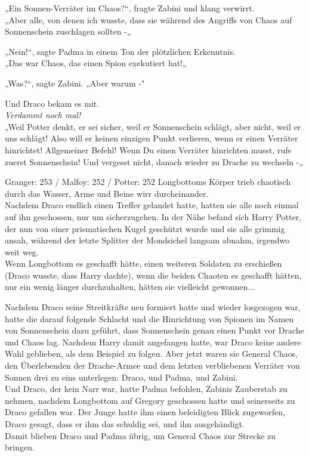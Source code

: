 {„Ein Sonnen-Verräter im Chaos?“, fragte Zabini und klang verwirrt.\\ „Aber alle, von denen ich wusste, dass sie während des Angriffs von Chaos auf Sonnenschein zuschlagen sollten -„

„Nein!“, sagte Padma in einem Ton der plötzlichen Erkenntnis.\\ „Das war Chaos, das einen Spion exekutiert hat!„

„Was?“, sagte Zabini. „Aber warum -"

Und Draco bekam es mit.\\ \emph{Verdammt noch mal!}\\ „Weil Potter denkt, er sei sicher, weil er Sonnenschein schlägt, aber nicht, weil er uns schlägt! Also will er keinen einzigen Punkt verlieren, wenn er einen Verräter hinrichtet! Allgemeiner Befehl! Wenn Du einen Verräter hinrichten musst, rufe zuerst Sonnenschein! Und vergesst nicht, danach wieder zu Drache zu wechseln -„

Granger: 253 / Malfoy: 252 / Potter: 252 Longbottoms Körper trieb chaotisch durch das Wasser, Arme und Beine wirr durcheinander.\\ Nachdem Draco endlich einen Treffer gelandet hatte, hatten sie alle noch einmal auf ihn geschossen, nur um sicherzugehen. In der Nähe befand sich Harry Potter, der nun von einer prismatischen Kugel geschützt wurde und sie alle grimmig ansah, während der letzte Splitter der Mondsichel langsam abnahm, irgendwo weit weg.\\ Wenn Longbottom es geschafft hätte, einen weiteren Soldaten zu erschießen (Draco wusste, dass Harry dachte), wenn die beiden Chaoten es geschafft hätten, nur ein wenig länger durchzuhalten, hätten sie vielleicht gewonnen...

Nachdem Draco seine Streitkräfte neu formiert hatte und wieder losgezogen war, hatte die darauf folgende Schlacht und die Hinrichtung von Spionen im Namen von Sonnenschein dazu geführt, dass Sonnenschein genau einen Punkt vor Drache und Chaos lag. Nachdem Harry damit angefangen hatte, war Draco keine andere Wahl geblieben, als dem Beispiel zu folgen. Aber jetzt waren sie General Chaos, den Überlebenden der Drache-Armee und dem letzten verbliebenen Verräter von Sonnen drei zu eins unterlegen: Draco, und Padma, und Zabini.\\ Und Draco, der kein Narr war, hatte Padma befohlen, Zabinis Zauberstab zu nehmen, nachdem Longbottom auf Gregory geschossen hatte und seinerseits zu Draco gefallen war. Der Junge hatte ihm einen beleidigten Blick zugeworfen, Draco gesagt, dass er ihm das schuldig sei, und ihn ausgehändigt.\\ Damit blieben Draco und Padma übrig, um General Chaos zur Strecke zu bringen.

}
